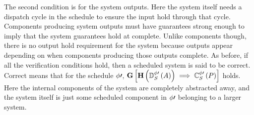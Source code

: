 The second condition is for the system outputs.
Here the system itself needs a dispatch cycle in the schedule to ensure the input hold through that cycle.
Components producing system outputs must have guarantees strong enough to imply that the system guarantees hold at complete.
Unlike components though, there is no output hold requirement for the system because outputs appear depending on when components producing those outputs complete.
As before, if all the verification conditions hold, then a scheduled system is said to be correct.
Correct means that for the schedule $\phi\prime$, $\mathbf{G}\left[\mathbf{H}\left(\mathbb{D}^{\phi\prime}_S\left(A\right)\right) 
\implies \mathbb{C}^{\phi\prime}_{S}\left(P\right)\right]$ holds.
Here the internal components of the system are completely abstracted away, and the system itself is just some scheduled component in $\phi\prime$ belonging to a larger system.
